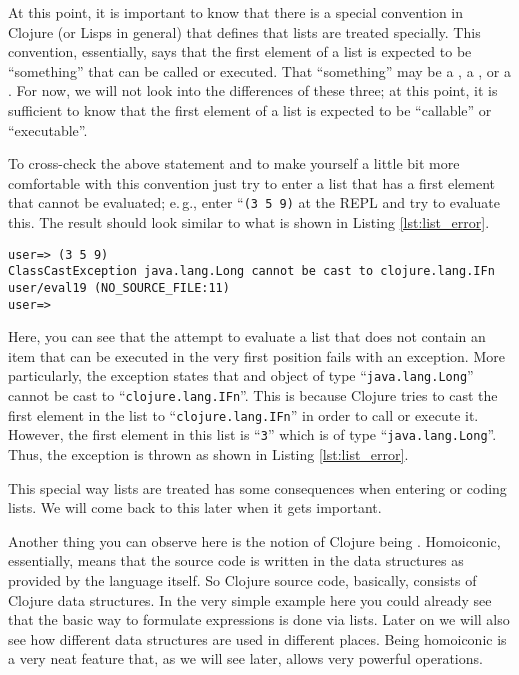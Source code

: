 At this point, it is important to know that there is a special convention in Clojure (or Lisps in general) that defines that lists are treated specially.
This convention, essentially, says that the first element of a list is expected to be ``something'' that can be called or executed.
That ``something'' may be a , a , or a .
For now, we will not look into the differences of these three;
at this point, it is sufficient to know that the first element of a list is expected to be ``callable'' or ``executable''.

To cross-check the above statement and to make yourself a little bit more comfortable with this convention just try to enter a list that has a first element that cannot be evaluated;
e.\,g., enter ``\texttt{(3 5 9)} at the REPL and try to evaluate this.
The result should look similar to what is shown in Listing \vref{lst:list_error}.

\begin{lstlisting}[label=lst:list_error, caption=Result of an Attempt to Evaluate a List with a Non-evaluable First Item]
user=> (3 5 9)
ClassCastException java.lang.Long cannot be cast to clojure.lang.IFn  user/eval19 (NO_SOURCE_FILE:11)
user=>
\end{lstlisting}

Here, you can see that the attempt to evaluate a list that does not contain an item that can be executed in the very first position fails with an exception.
More particularly, the exception states that and object of type ``\texttt{java.lang.Long}'' cannot be cast to ``\texttt{clojure.lang.IFn}''.
This is because Clojure tries to cast the first element in the list to ``\texttt{clojure.lang.IFn}'' in order to call or execute it.
However, the first element in this list is ``\texttt{3}'' which is of type ``\texttt{java.lang.Long}''.
Thus, the exception is thrown as shown in Listing \vref{lst:list_error}.

This special way lists are treated has some consequences when entering or coding lists.
We will come back to this later when it gets important.

Another thing you can observe here is the notion of Clojure being .
Homoiconic, essentially, means that the source code is written in the data structures as provided by the language itself.
So Clojure source code, basically, consists of Clojure data structures.
In the very simple example here you could already see that the basic way to formulate expressions is done via lists.
Later on we will also see how different data structures are used in different places.
Being homoiconic is a very neat feature that, as we will see later, allows very powerful operations.

